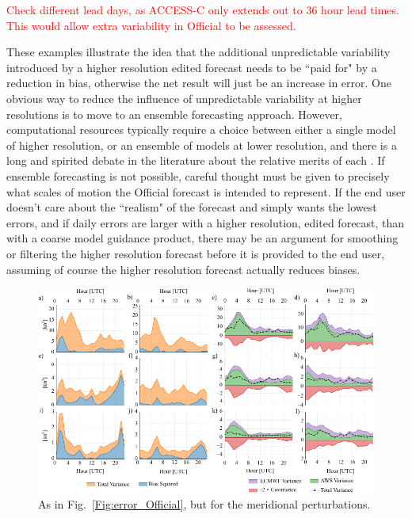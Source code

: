\documentclass[twocol]{ametsoc}
\begin{document}
\textcolor{red}{Check different lead days, as ACCESS-C only extends out to 36 hour lead times. This would allow extra variability in Official to be assessed.}

These examples illustrate the idea that the additional unpredictable variability introduced by a higher resolution edited forecast needs to be ``paid for" by a reduction in bias, otherwise the net result will just be an increase in error.  One obvious way to reduce the influence of unpredictable variability at higher resolutions is to move to an ensemble forecasting approach. However, computational resources typically require a choice between either a single model of higher resolution, or an ensemble of models at lower resolution, and there is a long and spirited debate in the literature about the relative merits of each \citep{brooks93}. If ensemble forecasting is not possible, careful thought must be given to precisely what scales of motion the Official forecast is intended to represent. If the end user doesn't care about the ``realism" of the forecast and simply wants the lowest errors, and if daily errors are larger with a higher resolution, edited forecast, than with a coarse model guidance product, there may be an argument for smoothing or filtering the higher resolution forecast before it is provided to the end user, assuming of course the higher resolution forecast actually reduces biases. 

\begin{figure}
\centering
\includegraphics[width=39pc]{error_ECMWF.pdf}
\caption{As in Fig.~\ref{Fig:error_Official}, but for the meridional perturbations.}
\label{Fig:error_ECMWF}
\end{figure}
\end{document}
